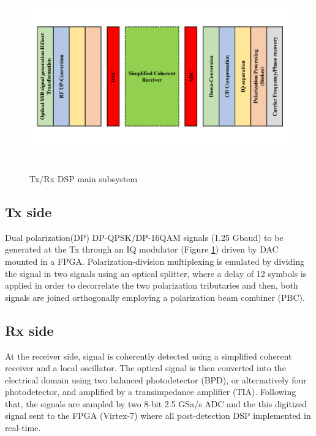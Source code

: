 \begin{figure}[h]
	\centering
	\includegraphics[width=1.0\textwidth, height=8cm]{./sdf/simplified_coherent_receiver/figures/detailed_subsystem.pdf}
	\caption{Tx/Rx DSP main subsystem}\label{DSP_main_subsystem}
\end{figure}

\subsection{Tx side}
Dual polarization(DP) DP-QPSK/DP-16QAM signals (1.25 Gbaud) to be generated at the Tx through an IQ modulator (Figure \ref{DSP_main_subsystem}) driven by DAC mounted in a FPGA. Polarization-division multiplexing is emulated by dividing the signal in two signals using an optical splitter, where a delay of 12 symbols is applied in order to decorrelate the two polarization tributaries and then, both signals are joined orthogonally employing a polarization beam combiner (PBC).

\subsection{Rx side}
At the receiver side, signal is coherently detected using a simplified coherent receiver and a local oscillator. The optical signal is then converted into the electrical domain using two balanced photodetector (BPD), or alternatively four photodetector, and amplified by a transimpedance amplifier (TIA). Following that, the signals are sampled by two 8-bit 2.5 GSa/s ADC and the this digitized signal sent to the FPGA (Virtex-7) where all post-detection DSP implemented in real-time.

